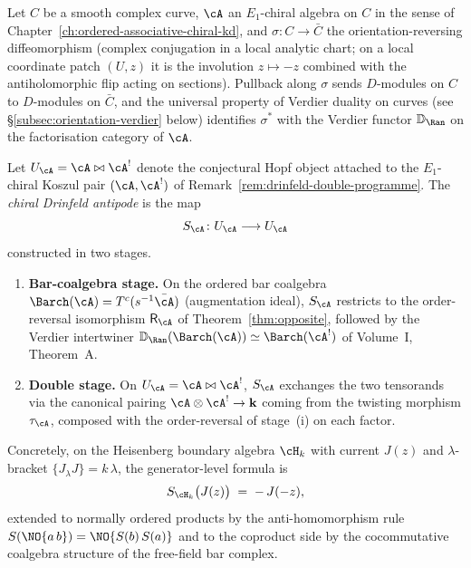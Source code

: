 Let $C$ be a smooth complex curve, $\cA$ an $E_1$-chiral algebra on
$C$ in the sense of Chapter~\ref{ch:ordered-associative-chiral-kd},
and $\sigma \colon C \to \bar{C}$ the orientation-reversing
diffeomorphism (complex conjugation in a local analytic chart; on a
local coordinate patch $(U, z)$ it is the involution $z \mapsto -z$
combined with the antiholomorphic flip acting on sections). Pullback
along $\sigma$ sends $D$-modules on $C$ to $D$-modules on $\bar{C}$,
and the universal property of Verdier duality on curves (see
\S\ref{subsec:orientation-verdier} below) identifies $\sigma^*$
with the Verdier functor $\mathbb{D}_{\Ran}$ on the factorisation
category of $\cA$.

\begin{definition}
\label{def:chiral-drinfeld-antipode}
Let $U_\cA = \cA \bowtie \cA^!$ denote the conjectural Hopf object
attached to the $E_1$-chiral Koszul pair $(\cA, \cA^!)$ of
Remark~\ref{rem:drinfeld-double-programme}. The
\emph{chiral Drinfeld antipode} is the map
\[
S_{\cA} \colon U_\cA \longrightarrow U_\cA
\]
constructed in two stages.
\begin{enumerate}
\item \textbf{Bar-coalgebra stage.} On the ordered bar coalgebra
$\Barch(\cA) = T^c(s^{-1}\bar\cA)$ (augmentation ideal),
$S_{\cA}$ restricts to the order-reversal isomorphism $\mathsf{R}_{\cA}$
of Theorem~\ref{thm:opposite}, followed by the Verdier intertwiner
$\mathbb{D}_{\Ran}(\Barch(\cA)) \simeq \Barch(\cA^!)$ of Volume~I,
Theorem~A.
\item \textbf{Double stage.} On $U_\cA = \cA \bowtie \cA^!$,
$S_{\cA}$ exchanges the two tensorands via the canonical pairing
$\cA \otimes \cA^! \to \mathbf{k}$ coming from the twisting morphism
$\tau_\cA$, composed with the order-reversal of stage~(i) on each
factor.
\end{enumerate}
Concretely, on the Heisenberg boundary algebra $\cH_k$ with current
$J(z)$ and $\lambda$-bracket $\{J_\lambda J\} = k\,\lambda$, the
generator-level formula is
\begin{equation}
\label{eq:antipode-heisenberg}
S_{\cH_k}\bigl(J(z)\bigr) \;=\; -\,J(-z),
\end{equation}
extended to normally ordered products by the anti-homomorphism rule
$S(\NO{a\,b}) = \NO{S(b)\,S(a)}$ and to the coproduct side by the
cocommutative coalgebra structure of the free-field bar complex.
\end{definition}

